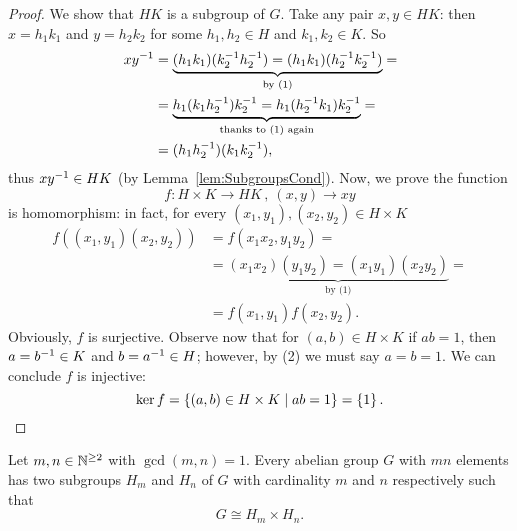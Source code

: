 \begin{proof}
We show that \(HK\) is a subgroup of \(G\). Take any pair \(x, y \in HK\): then \(x = h_1k_1\) and \(y = h_2k_2\) for some \(h_1, h_2 \in H\) and \(k_1, k_2 \in K\). So
\begin{align*}
x y^{-1} & = \underbrace{(h_1k_1) (k^{-1}_2 h^{-1}_2) = (h_1k_1) (h^{-1}_2 k^{-1}_2)}_{\text{by (1)}} = \\
& = \underbrace{h_1 (k_1 h^{-1}_2) k^{-1}_2 = h_1 (h^{-1}_2 k_1) k^{-1}_2}_{\text{thanks to (1) again}} = \\
 & = (h_1 h^{-1}_2) (k_1 k^{-1}_2) ,
\end{align*}
thus \(x y^{-1} \in HK\) (by Lemma~\ref{lem:SubgroupsCond}). Now, we prove the function
\[f : H \times K \to HK\,, \ (x, y) \to xy\]
is homomorphism: in fact, for every \((x_1, y_1), (x_2, y_2) \in H \times K\)
\begin{align*}
f((x_1, y_1) (x_2, y_2)) & = f(x_1x_2, y_1y_2) = \\
                         & = \underbrace{(x_1x_2)(y_1y_2) = (x_1y_1)(x_2y_2)}_{\text{by (1)}} = \\
                         & = f(x_1, y_1) f(x_2, y_2) .
\end{align*}
Obviously, \(f\) is surjective. Observe now that for \((a, b) \in H \times K\) if \(ab = 1\), then \(a = b^{-1} \in K\) and \(b = a^{-1} \in H\); however, by (2) we must say \(a = b = 1\). We can conclude \(f\) is injective:
\[\ker f = \left\{(a, b) \in H \times K \mid ab = 1\right\} = \left\{1\right\} .\qedhere\]
\end{proof}

\begin{proposition}\label{prop:CRT}
Let \(m, n \in \mathbb N^{\ge 2}\) with \(\gcd(m,n) = 1\). Every abelian group \(G\) with \(mn\) elements has two subgroups \(H_m\) and \(H_n\) of \(G\) with cardinality \(m\) and \(n\) respectively such that
\[G \cong H_m \times H_n .\]
\end{proposition}

